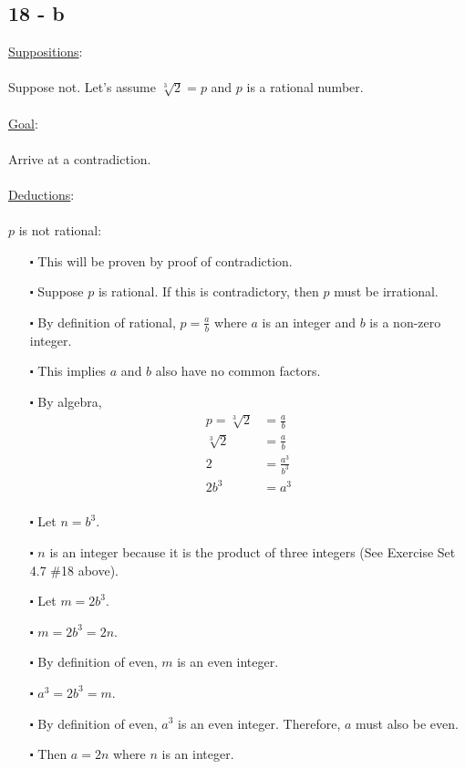 \documentclass[12pt]{article}
\begin{document}
\subsection*{18 - b}
\underline{Suppositions}:
\\ \\
Suppose not. Let's assume $\sqrt[3]{2} = p$ and $p$ is a rational number.
\\ \\ 
\underline{Goal}:
\\ \\
Arrive at a contradiction.
\\ \\
\underline{Deductions}:
\\ \\
$p$ is not rational:
\begin{itemize}
  \item [$\centerdot$] This will be proven by proof of contradiction.
  \item [$\centerdot$] Suppose $p$ is rational. If this is contradictory, then $p$ must be irrational.
  \item [$\centerdot$] By definition of rational, $p = \frac{a}{b}$ where $a$ is an integer and $b$ is a non-zero integer.
  \item [$\centerdot$] This implies $a$ and $b$ also have no common factors.
  \item [$\centerdot$] By algebra,
  \begin{align*}
    p =\sqrt[3]{2} &=\frac{a}{b} \\
    \sqrt[3]{2} &= \frac{a}{b} \\
    2 &= \frac{a^3}{b^3} \\
    2b^3 &= a^3\\
  \end{align*}
  \item [$\centerdot$] Let $n = b^3$. 
  \item [$\centerdot$] $n$ is an integer because it is the product of three integers (See Exercise Set 4.7 \#18  above).
  \item [$\centerdot$] Let $m = 2b^3$.
  \item [$\centerdot$] $m = 2b^3 = 2n$.
  \item [$\centerdot$] By definition of even, $m$ is an even integer.
  \item [$\centerdot$] $a^3 = 2b^3 = m$.
  \item [$\centerdot$] By definition of even, $a^3$ is an even integer. Therefore, $a$ must also be even.
  \item [$\centerdot$] Then $a = 2n$ where $n$ is an integer.

\end{itemize}
\end{document}
